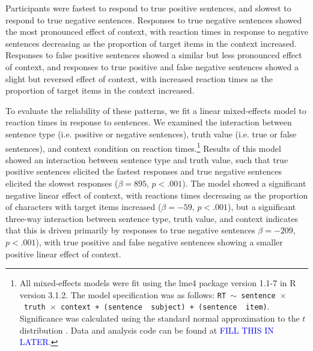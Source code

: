 \documentclass[man, noapacite]{apa2}
\begin{document}
Participants were fastest to respond to true positive sentences, and slowest to respond to true negative sentences.  Responses to true negative sentences showed the most pronounced effect of context, with reaction times in response to negative sentences decreasing as the proportion of target items in the context increased.  Responses to false positive sentences showed a similar but less pronounced effect of context, and responses to true positive and false negative sentences showed a slight but reversed effect of context, with increased reaction times as the proportion of target items in the context increased.  

To evaluate the reliability of these patterns, we fit a linear mixed-effects model to reaction times in response to sentences.  We examined the interaction between sentence type (i.e. positive or negative sentences), truth value (i.e. true or false sentences), and context condition on reaction times.\footnote{All mixed-effects models were fit using the lme4 package version 1.1-7 in R version 3.1.2.  The model specification was as follows: \texttt{RT $\sim$ sentence~$\times$~truth~$\times$~context + (sentence~\textbar~subject) +  (sentence~\textbar~item)}.  Significance was calculated using the standard normal approximation to the $t$ distribution \cite{barr2013}. Data and analysis code can be found at \textcolor{blue}{FILL THIS IN LATER.}}  Results of this model showed an interaction between sentence type and truth value, such that true positive sentences elicited the fastest responses and true negative sentences elicited the slowest responses ($\beta= 895$, $p< .001$).  The model showed a significant negative linear effect of context, with reactions times decreasing as the proportion of characters with target items increased ($\beta= -59$, $p< .001$), but a significant three-way interaction between sentence type, truth value, and context indicates that this is driven primarily by responses to true negative sentences $\beta= -209$, $p< .001$), with true positive and false negative sentences showing a smaller positive linear effect of context.  
\end{document}
